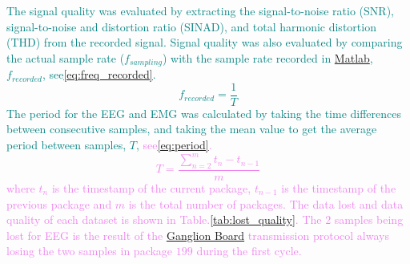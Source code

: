 \textcolor{teal}{The signal quality was evaluated by extracting the signal-to-noise ratio (SNR), signal-to-noise and distortion ratio (SINAD), and total harmonic distortion (THD) from the recorded signal. Signal quality was also evaluated by comparing the actual sample rate ($f_{sampling}$) with the sample rate recorded in \href{https://se.mathworks.com/products/matlab.html}{Matlab}, $f_{recorded}$, see\:\eqref{eq:freq_recorded}.}
\textcolor{teal}{\begin{dmath}
		\label{eq:freq_recorded}
		f_{recorded} = \frac{1}{T}
	\end{dmath}}
\textcolor{teal}{The period for the EEG and EMG was calculated by taking the time differences between consecutive samples, and taking the mean value to get the average period between samples, $T$, }\textcolor{violet}{see\:\eqref{eq:period}.
	\begin{dmath}
		\label{eq:period}
		T = \frac{\sum_{n = 2}^{m} t_n-t_{n-1}}{m}
	\end{dmath}
	where $t_n$ is the timestamp of the current package, $t_{n-1}$ is the timestamp of the previous package and $m$ is the total number of packages.}
\textcolor{violet}{The data lost and data quality of each dataset is shown in Table.\:\ref{tab:lost_quality}. The $2$ samples being lost for EEG is the result of the \href{https://docs.openbci.com/Ganglion/GanglionLanding/}{Ganglion Board} transmission protocol always losing the two samples in package $199$ during the first cycle.}
